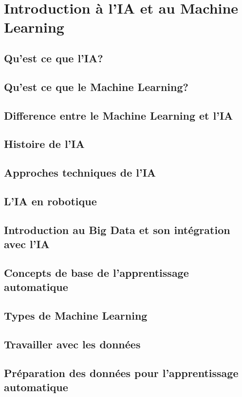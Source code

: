 \documentclass{beamer}
\begin{document}
\section{Introduction à l'IA et au Machine Learning}
\subsection{Qu'est ce que l'IA?}
\subsection{Qu'est ce que le Machine Learning?}
\subsection{Difference entre le Machine Learning et l'IA}
\subsection{Histoire de l'IA}
\subsection{Approches techniques de l'IA}
\subsection{L'IA en robotique}
\subsection{Introduction au Big Data et son intégration avec l'IA}
\subsection{Concepts de base de l'apprentissage automatique}
\subsection{Types de Machine Learning}
\subsection{Travailler avec les données}
\subsection{Préparation des données pour l'apprentissage automatique}
\end{document}
